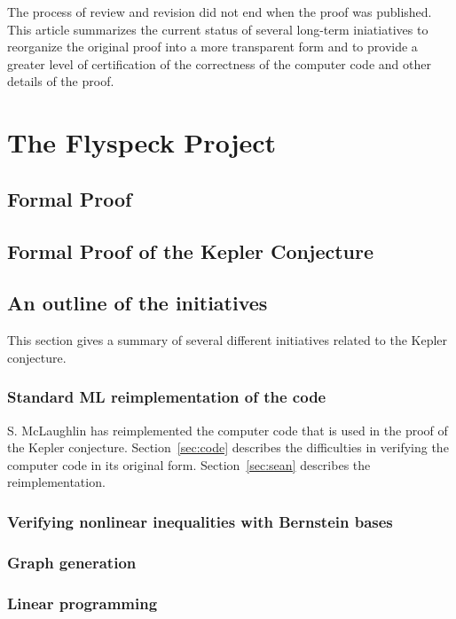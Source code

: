 \documentclass[11pt]{amsart}
\begin{document}
The process of review and revision did not end when the proof was published.
This article summarizes the current status of several long-term iniatiatives to
reorganize the original proof into a more transparent form and to provide a greater
level of certification of the correctness of the computer code and other details of the proof.

\section{The Flyspeck Project}

\subsection{Formal Proof}


\subsection{Formal Proof of the Kepler Conjecture}


\subsection{An outline of the initiatives}

This section gives a summary of several different initiatives related to the Kepler conjecture.

\subsubsection{Standard ML reimplementation of the code}

S. McLaughlin has reimplemented the computer code that is used in the proof
of the Kepler conjecture.  Section~\ref{sec:code} describes the difficulties
in verifying the computer code in its original form.  Section~\ref{sec:sean}
describes the reimplementation.

\subsubsection{Verifying nonlinear inequalities with Bernstein bases}

\subsubsection{Graph generation}

\subsubsection{Linear programming}
\end{document}
